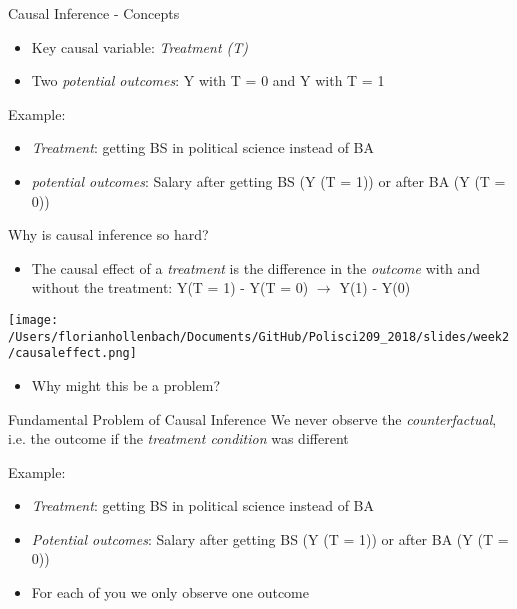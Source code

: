 \documentclass[presentation]{beamer}
\begin{document}
\begin{frame}[label={sec:org0adce73}]{Causal Inference - Concepts}
\begin{itemize}
\item Key causal variable: \emph{Treatment (T)}
\item Two \emph{potential outcomes}: Y with T = 0 and Y with T = 1
\end{itemize}

\pause
Example:
\begin{itemize}
\item \emph{Treatment}: getting BS in political science instead of BA
\item \emph{potential outcomes}: Salary after getting BS (Y (T = 1)) or after BA (Y (T = 0))
\end{itemize}
\end{frame}


\begin{frame}[label={sec:org192503f}]{Why is causal inference so hard?}
\begin{itemize}
\item The causal effect of a \emph{treatment} is the difference in the \emph{outcome} with and without the treatment:
Y(T = 1) - Y(T = 0) \(\rightarrow\) Y(1) - Y(0)
\end{itemize}

\pause
\begin{center}
\texttt{[image: /Users/florianhollenbach/Documents/GitHub/Polisci209\_2018/slides/week2/causaleffect.png]}
\end{center}

\begin{itemize}
\item Why might this be a problem?
\end{itemize}
\end{frame}

\begin{frame}[label={sec:org98968d7}]{Fundamental Problem of Causal Inference}
We never observe the \emph{counterfactual}, i.e. the outcome if the \emph{treatment condition} was different

\pause
Example:
\begin{itemize}
\item \emph{Treatment}: getting BS in political science instead of BA
\item \emph{Potential outcomes}: Salary after getting BS (Y (T = 1)) or after BA (Y (T = 0))
\item For each of you we only observe one outcome
\end{itemize}
\end{frame}
\end{document}
